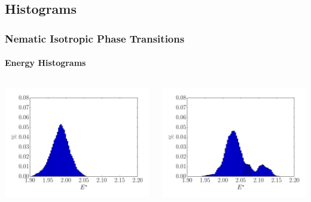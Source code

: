\documentclass{beamer}
\begin{document}
\subsection{Histograms}
\begin{frame}
	\frametitle{Nematic Isotropic Phase Transitions}
	\framesubtitle{Energy Histograms}
\vspace{-0.3cm}
\begin{columns}
    \begin{column}{6cm}
    \center
    	\includegraphics[scale=0.28]{figures/histo_11208.pdf}
	\end{column}

	\begin{column}{6cm}
	\center
    	\includegraphics[scale=0.28]{figures/histo_11228.pdf}
	\end{column}


\end{columns}
\end{frame}
\end{document}
